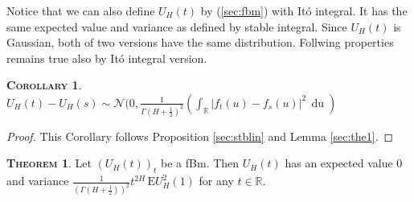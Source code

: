 \documentclass[a4paper, twoside, 11pt]{article}
\theoremstyle{definition}
\newtheorem{theorem}[definition]{\scshape Theorem}
\newtheorem{corollary}[definition]{\scshape Corollary}
\begin{document}
Notice that we can also define $U_H(t)$ by (\ref{sec:fbm}) with It\'o integral. It has the same expected value and variance as defined by stable integral. Since $U_H(t)$ is Gaussian, both of two versions have the same distribution. Follwing properties remains true also by It\'o integral version.
\begin{corollary}
  $U_H(t)-U_H(s) \sim \mathcal{N}(0, \frac{1}{\Gamma(H+\frac{1}{2})^2}(\int_{\mathbb{R}} |f_t(u)-f_s(u)|^2\, \mathop{du})$
  \label{sec:the2}
\end{corollary}
\begin{proof}
  This Corollary follows Proposition \ref{sec:stblin} and Lemma \ref{sec:the1}.
\end{proof}
\begin{theorem}
  Let $(U_H(t))_t$ be a fBm. Then $U_H(t)$ has an expected value $0$ and variance $\frac{1}{(\Gamma(H+\frac{1}{2}))^2}t^{2H}\, \mathrm{E} U^2_H(1)$ for any $t \in \mathbb{R}$.
  \label{sec:fbmp1}
\end{theorem}
\end{document}
